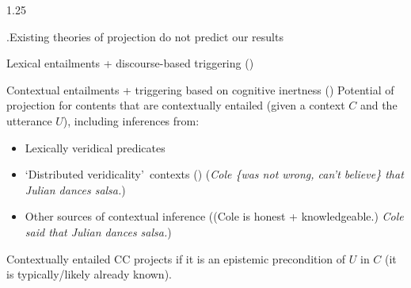 \documentclass[final, table]{beamer}
\newlength{\colwidth}
\begin{document}
\begin{frame}[t]
\begin{columns}[t]
\begin{column}{1.25\colwidth}
\begin{normalbox}{\phantom.\hfill Existing theories of projection do not predict our results}
\begin{theorybox}{Lexical entailments + discourse-based triggering \hfill (\citealt{abrusan_predicting_2011,simons_best_2017})}
				\end{theorybox}

				\begin{theorybox}{Contextual entailments + triggering based on cognitive inertness \hfill (\citealt{schlenker_triggering_2021})}
					\small Potential of projection for contents that are contextually entailed (given a context $C$ and the utterance $U$), including inferences from:
					\vspace{-.3\baselineskip}
					\begin{itemize}
						\item Lexically veridical predicates
						\item \lq Distributed veridicality\rq\ contexts (\citealt{roberts_i_2019}) \hfill (\textit{Cole \{was not wrong, can’t believe\} that Julian dances salsa.})
						\item Other sources of contextual inference \hfill ((Cole is honest + knowledgeable.) \textit{Cole said that Julian dances salsa.})
					\end{itemize}
					\vspace{-.2\baselineskip}
					Contextually entailed CC projects if it is an epistemic precondition of $U$ in $C$ (it is typically/likely already known).

				\end{theorybox}



\end{normalbox}
\end{column}
\end{columns}
\end{frame}
\end{document}
